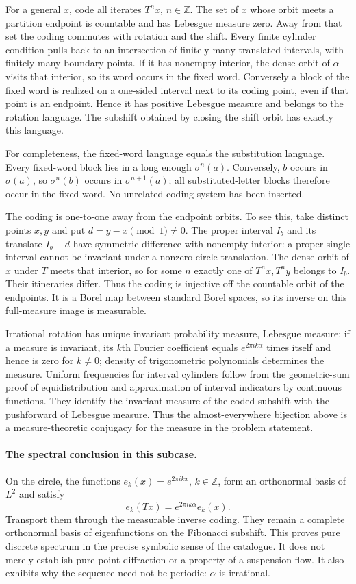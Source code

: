 \documentclass[11pt]{article}
\begin{document}
For a general $x$, code all iterates $T^nx$, $n\in\mathbb Z$. The set
of $x$ whose orbit meets a partition endpoint is countable and has
Lebesgue measure zero. Away from that set the coding commutes with
rotation and the shift. Every finite cylinder condition pulls back to
an intersection of finitely many translated intervals, with finitely
many boundary points. If it has nonempty interior, the dense orbit of
$\alpha$ visits that interior, so its word occurs in the fixed word.
Conversely a block of the fixed word is realized on a one-sided interval
next to its coding point, even if that point is an endpoint. Hence it
has positive Lebesgue measure and belongs to the rotation language.
The subshift obtained by closing the shift orbit has exactly this language.

For completeness, the fixed-word language equals the substitution language.
Every fixed-word block lies in a long enough $\sigma^n(a)$. Conversely,
$b$ occurs in $\sigma(a)$, so $\sigma^n(b)$ occurs in
$\sigma^{n+1}(a)$; all substituted-letter blocks therefore occur in the
fixed word. No unrelated coding system has been inserted.

The coding is one-to-one away from the endpoint orbits. To see this,
take distinct points $x,y$ and put $d=y-x\pmod1\ne0$. The proper
interval $I_b$ and its translate $I_b-d$ have symmetric difference
with nonempty interior: a proper single interval cannot be invariant
under a nonzero circle translation. The dense orbit of $x$ under
$T$ meets that interior, so for some $n$ exactly one of $T^nx,T^ny$
belongs to $I_b$. Their itineraries differ. Thus the coding is injective
off the countable orbit of the endpoints. It is a Borel map between
standard Borel spaces, so its inverse on this full-measure image is
measurable.

Irrational rotation has unique invariant probability measure, Lebesgue
measure: if a measure is invariant, its $k$th Fourier coefficient equals
$e^{2\pi i k\alpha}$ times itself and hence is zero for $k\ne0$;
density of trigonometric polynomials determines the measure. Uniform
frequencies for interval cylinders follow from the geometric-sum proof of
equidistribution and approximation of interval indicators by continuous
functions. They identify the invariant measure of the coded subshift
with the pushforward of Lebesgue measure. Thus the almost-everywhere
bijection above is a measure-theoretic conjugacy for the measure in the
problem statement.

\paragraph{The spectral conclusion in this subcase.}
On the circle, the functions $e_k(x)=e^{2\pi i kx}$, $k\in\mathbb Z$,
form an orthonormal basis of $L^2$ and satisfy
\[
 e_k(Tx)=e^{2\pi i k\alpha}e_k(x).
\]
Transport them through the measurable inverse coding. They remain a
complete orthonormal basis of eigenfunctions on the Fibonacci subshift.
This proves pure discrete spectrum in the precise symbolic sense of the
catalogue. It does not merely establish pure-point diffraction or a
property of a suspension flow. It also exhibits why the sequence need
not be periodic: $\alpha$ is irrational.
\end{document}
